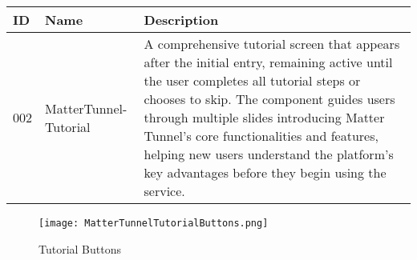\documentclass[conference]{IEEEtran}
\begin{document}
\begin{enumerate}[itemsep=2ex, parsep=1ex]
	      \begin{table}[h!]
	      	\def\arraystretch{1.24} \small
	      	\begin{tabular}{|p{1.2cm}|p{2.5cm}|p{4.0cm}|}
	      		\hline
	      		ID  & Name                  & Description                                                                                                                                                                                                                                                                                                                                                              \\
	      		\hline
	      		002 & MatterTunnel-Tutorial & A comprehensive tutorial screen that appears after the initial entry, remaining active until the user completes all tutorial steps or chooses to skip. The component guides users through multiple slides introducing Matter Tunnel's core functionalities and features, helping new users understand the platform's key advantages before they begin using the service. \\
	      		\hline
	      	\end{tabular}
	      \end{table}
	      
            \clearpage
          
	      \begin{figure}[h!]
	      	\centering
	      	\texttt{[image: MatterTunnelTutorialButtons.png]}
	      	\caption{Tutorial Buttons}
	      	\label{fig:MatterTunnelTutorialButtons}
	      \end{figure}
	      	          

\end{enumerate}
\end{document}
